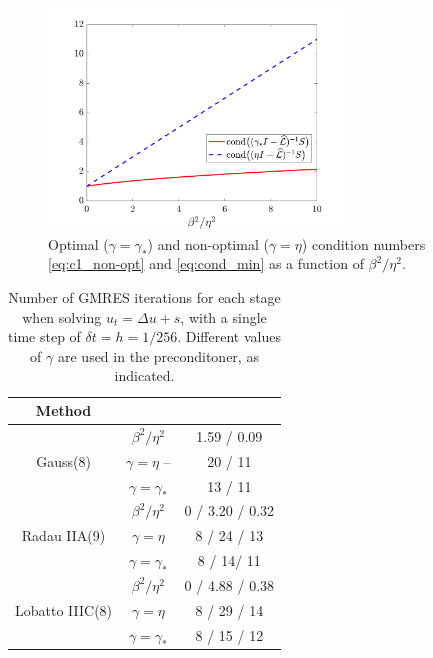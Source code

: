 \documentclass[a4paper,10pt]{article}
\begin{document}
{\begin{figure}[h!]
\centering
\includegraphics[width = 0.7\textwidth]{conds}
\caption{Optimal ($\gamma = \gamma_*$) and non-optimal ($\gamma = \eta$) condition numbers \eqref{eq:c1_non-opt} and \eqref{eq:cond_min} as a function of $\beta^2/\eta^2$. }
\label{fig:conds}
\end{figure}

\renewcommand{\tabcolsep}{4pt}
\renewcommand{\arraystretch}{1.15}
\begin{table}[!ht]
  \centering
  \begin{tabular}{| c | c | c |}  %
  \hline
Method & &  \\ \hline
\multirow{ 3}{*}{Gauss(8)}
&$\beta^2/\eta^2$ & 1.59 / 0.09 \\
&$\gamma = \eta$  -- & 20 / 11\\
&$\gamma = \gamma_*$ & 13 / 11\\ \hline
\multirow{ 3}{*}{Radau IIA(9)}
&$\beta^2/\eta^2$ & 0 / 3.20 / 0.32	\\
&$\gamma = \eta$ &  8 / 24 / 13\\
&$\gamma = \gamma_*$ & 8 / 14/ 11 \\ \hline
\multirow{ 3}{*}{Lobatto IIIC(8)}
&$\beta^2/\eta^2$ & 0 / 4.88 / 0.38 \\
&$\gamma = \eta$ & 8 / 29 / 14\\
&$\gamma = \gamma_*$ & 8 / 15 / 12\\
  \hline
  \end{tabular}
  \caption{
Number of GMRES iterations for each stage when solving $u_t = \Delta u + s$, with a single time step of $\delta t = h = 1/256$. Different values of $\gamma$ are used in the preconditoner, as indicated.
}
\label{tab:cond_iters}
\end{table}

}
\end{document}
